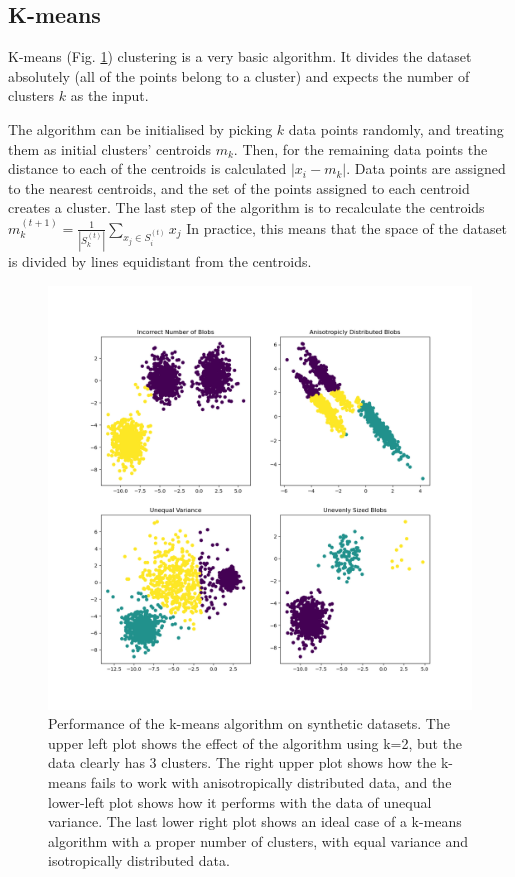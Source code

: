 \subsection{K-means}

K-means (Fig. \ref{fig:kmeans}) clustering is a very basic algorithm. It divides the dataset absolutely (all of the points belong to a cluster) and expects the number of clusters $k$ as the input.

The algorithm can be initialised by picking $k$ data points randomly, and treating them as initial clusters' centroids $m_{k}$.
Then, for the remaining data points the distance to each of the centroids is calculated $|x_{i} - m_{k}|$.
Data points are assigned to the nearest centroids, and the set of the points assigned to each centroid creates a cluster.
The last step of the algorithm is to recalculate the centroids $m^{(t+1)}_k = \frac{1}{\left|S^{(t)}_k\right|} \sum_{x_j \in S^{(t)}_i} x_j $
In practice, this means that the space of the dataset is divided by lines equidistant from the centroids.


\begin{figure}
  \centering
  \includegraphics[width=0.6\linewidth]{figures/chapter3/sphx_glr_plot_kmeans_assumptions_001.png}
  \caption{Performance of the k-means algorithm on synthetic datasets. The upper left plot shows the effect of the algorithm using k=2, but the data clearly has 3 clusters. The right upper plot shows how the k-means fails to work with anisotropically distributed data, and the lower-left plot shows how it performs with the data of unequal variance. The last lower right plot shows an ideal case of a k-means algorithm with a proper number of clusters, with equal variance and isotropically distributed data. }
  \label{fig:kmeans}
\end{figure}


